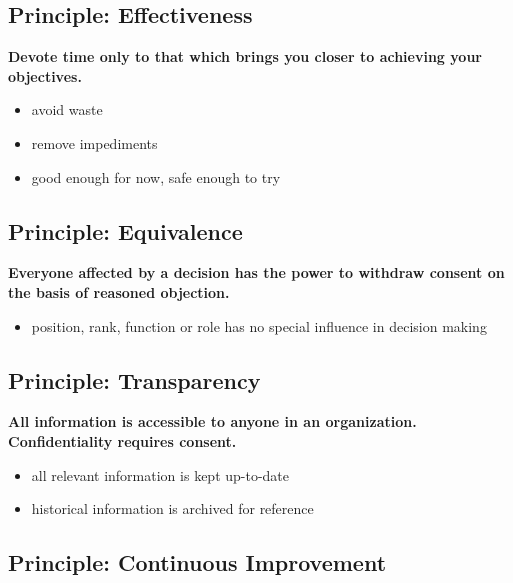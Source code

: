 \subsection{Principle: Effectiveness}
\label{principle:effectiveness}

\textbf{Devote time only to that which brings you closer to achieving your objectives.}

\begin{itemize}
\item avoid waste

\item remove impediments

\item good enough for now, safe enough to try

\end{itemize}

\subsection{Principle: Equivalence}
\label{principle:equivalence}

\textbf{Everyone affected by a decision has the power to withdraw consent on the basis of reasoned objection.}

\begin{itemize}
\item position, rank, function or role has no special influence in decision making

\end{itemize}

\subsection{Principle: Transparency}
\label{principle:transparency}

\textbf{All information is accessible to anyone in an organization. Confidentiality requires consent.}

\begin{itemize}
\item all relevant information is kept up-to-date

\item historical information is archived for reference

\end{itemize}

\subsection{Principle: Continuous Improvement}
\label{principle:continuousimprovement}

